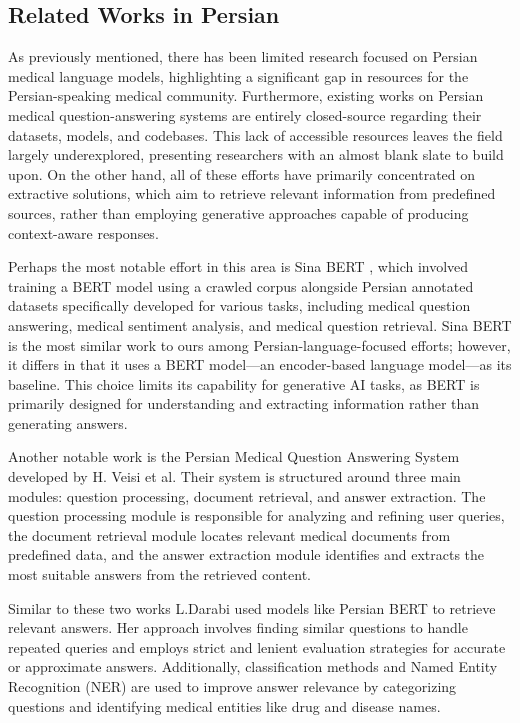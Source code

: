 \documentclass[conference]{IEEEtran}
\begin{document}
\subsection{Related Works in Persian}
As previously mentioned, there has been limited research focused on Persian medical language models, highlighting a significant gap in resources for the Persian-speaking medical community. Furthermore, existing works on Persian medical question-answering systems are entirely closed-source regarding their datasets, models, and codebases. This lack of accessible resources leaves the field largely underexplored, presenting researchers with an almost blank slate to build upon. On the other hand, all of these efforts have primarily concentrated on extractive solutions, which aim to retrieve relevant information from predefined sources, rather than employing generative approaches capable of producing context-aware responses.

Perhaps the most notable effort in this area is Sina BERT \cite{b4}, which involved training a BERT model using a crawled corpus alongside Persian annotated datasets specifically developed for various tasks, including medical question answering, medical sentiment analysis, and medical question retrieval. Sina BERT is the most similar work to ours among Persian-language-focused efforts; however, it differs in that it uses a BERT model—an encoder-based language model—as its baseline. This choice limits its capability for generative AI tasks, as BERT is primarily designed for understanding and extracting information rather than generating answers.

Another notable work is the Persian Medical Question Answering System developed by H. Veisi et al.
\cite{b5}
Their system is structured around three main modules: question processing, document retrieval, and answer extraction. The question processing module is responsible for analyzing and refining user queries, the document retrieval module locates relevant medical documents from predefined data, and the answer extraction module identifies and extracts the most suitable answers from the retrieved content.

Similar to these two works L.Darabi
\cite{b6}
used models like Persian BERT
\cite{b7}
to retrieve relevant answers. Her approach involves finding similar questions to handle repeated queries and employs strict and lenient evaluation strategies for accurate or approximate answers. Additionally, classification methods and Named Entity Recognition (NER) are used to improve answer relevance by categorizing questions and identifying medical entities like drug and disease names.
\end{document}

